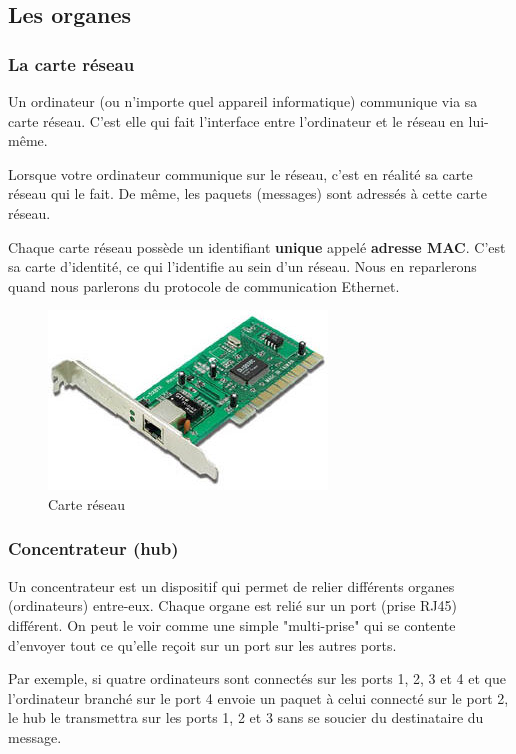 \subsection{Les organes}
\label{sec:organes}
\subsubsection{La carte réseau}
\label{sec:CarteReseau}
Un ordinateur (ou n'importe quel appareil informatique) communique via sa carte réseau. C'est elle qui fait l'interface entre l'ordinateur et le réseau en lui-même.

Lorsque votre ordinateur communique sur le réseau, c'est en réalité sa carte réseau qui le fait. De même, les paquets (messages) sont adressés à cette carte réseau.

Chaque carte réseau possède un identifiant \textbf{unique} appelé \textbf{adresse MAC}. C'est sa carte d'identité, ce qui l'identifie au sein d'un réseau. Nous en reparlerons quand nous parlerons du protocole de communication Ethernet.

\begin{figure}[h]
\centering
  \includegraphics[width=.4\textwidth]{images/materiel/carteReseau}
  \caption{Carte réseau}
  \label{fig:carteReseau}
\end{figure}

\subsubsection{Concentrateur (hub)}
\label{sec:concentrateur}
Un concentrateur est un dispositif qui permet de relier différents organes (ordinateurs) entre-eux. Chaque organe est relié sur un port (prise RJ45) différent. On peut le voir comme une simple "multi-prise" qui se contente d'envoyer tout ce qu'elle reçoit sur un port sur les autres ports.

Par exemple, si quatre ordinateurs sont connectés sur les ports 1, 2, 3 et 4 et que l'ordinateur branché sur le port 4 envoie un paquet à celui connecté sur le port 2, le hub le transmettra sur les ports 1, 2 et 3 sans se soucier du destinataire du message.

